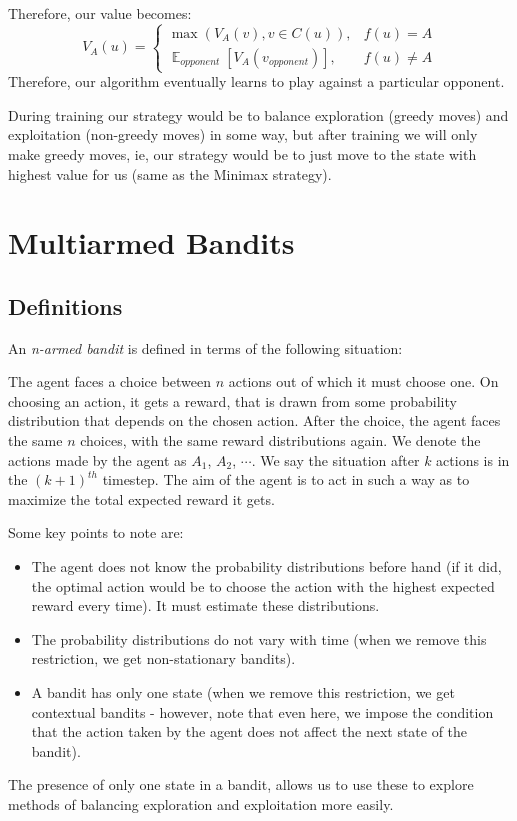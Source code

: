 \documentclass[12pt]{report}
\begin{document}
Therefore, our value becomes:
\begin{equation}
    V_{A}(u) = \begin{cases}
        \max(V_{A}(v), v \in C(u)), & f(u) = A\\
        \mathop{\mathbb{E}}_{opponent}\left[V_{A}(v_{opponent})\right], & f(u) \neq A
    \end{cases}
\end{equation}
Therefore, our algorithm eventually learns to play against a particular opponent.

During training our strategy would be to balance exploration (greedy moves) and exploitation (non-greedy moves) in some way, but after training
we will only make greedy moves, ie, our strategy would be to just move to the state with highest value for us (same as the Minimax strategy).

\chapter{Multiarmed Bandits}
\section{Definitions}
An \textit{n-armed bandit} is defined in terms of the following situation:

The agent faces a choice between $n$ actions out of which it must choose one. On choosing an action, it gets a reward, that is drawn from some probability distribution that depends on the chosen action. 
After the choice, the agent faces the same $n$ choices, with the same reward distributions again. We denote the actions made by the agent as $A_{1}$, $A_{2}$, $\cdots$. We say the situation after $k$ actions is in the $(k+1)^{th}$ timestep.
The aim of the agent is to act in such a way as to maximize the total expected reward it gets.

Some key points to note are:
\begin{itemize}
    \item The agent does not know the probability distributions before hand (if it did, the optimal action would be to choose the action with the highest expected reward every time). It must estimate these distributions.
    \item The probability distributions do not vary with time (when we remove this restriction, we get non-stationary bandits).
    \item A bandit has only one state (when we remove this restriction, we get contextual bandits - however, note that even here, we impose the condition that the action taken by the agent does not affect the next state of the bandit).
\end{itemize}
The presence of only one state in a bandit, allows us to use these to explore methods of balancing exploration and exploitation more easily.
\end{document}
